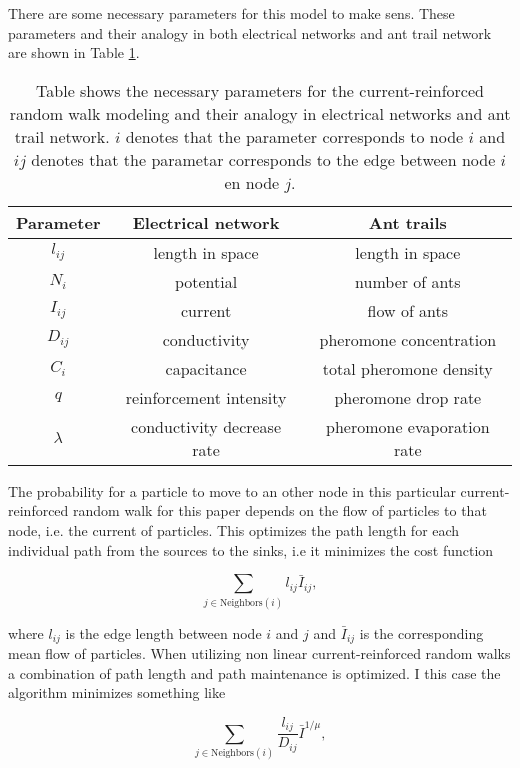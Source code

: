 There are some necessary parameters for this model to make sens. These parameters and their analogy in both electrical networks and ant trail network are shown in Table \ref{tab:parameters}.
\begin{table}
\centering
\caption{Table shows the necessary parameters for the current-reinforced random walk modeling and their analogy in electrical networks and ant trail network. $i$ denotes that the parameter corresponds to node $i$ and $ij$ denotes that the parametar corresponds to the edge between node $i$ en node $j$.}
\label{tab:parameters}
\begin{tabular}{ c | c | c }                       
	\textbf{Parameter} & \textbf{Electrical network} & \textbf{Ant trails} \\
	\hline
	$l_{ij}$ & length in space & length in space \\
	\hline
	$N_{i}$ & potential & number of ants \\
	\hline
	$I_{ij}$ & current & flow of ants \\
	\hline
	$D_{ij}$ & conductivity & pheromone concentration \\
	\hline
	$C_{i}$ & capacitance & total pheromone density \\
	\hline
	$q$ & reinforcement intensity & pheromone drop rate \\
	\hline
	$\lambda$ & conductivity decrease rate & pheromone evaporation rate \\
\end{tabular} 
\end{table}

The probability for a particle to move to an other node in this particular current-reinforced random walk for this paper depends on the flow of particles to that node, i.e. the current of particles. This optimizes the path length for each individual path from the sources to the sinks, i.e it minimizes the cost function

\begin{equation}
\sum_{j \in \text{Neighbors}(i)} l_{ij} \bar{I}_{ij},
\end{equation}

\noindent where $l_{ij}$ is the edge length between node $i$ and $j$ and $\bar{I}_{ij}$ is the corresponding mean flow of particles. When utilizing non linear current-reinforced random walks a combination of path length and path maintenance is optimized. I this case the algorithm minimizes something like

\begin{equation}
\sum_{j \in \text{Neighbors}(i)}\frac{l_{ij}}{D_{ij}}\bar{I}^{1/\mu},
\end{equation}

